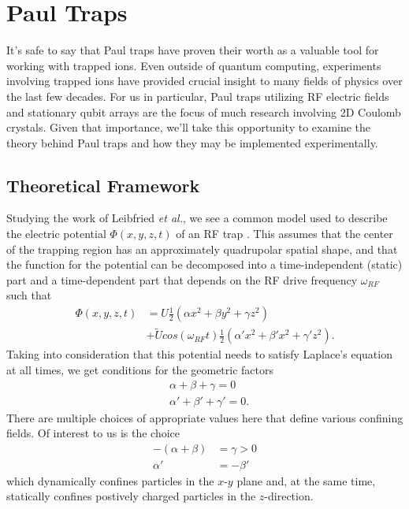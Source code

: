 \section{Paul Traps}
It's safe to say that Paul traps have proven their worth as a valuable tool for working with trapped ions. Even outside of quantum computing, experiments involving trapped ions have provided crucial insight to many fields of physics over the last few decades. For us in particular, Paul traps utilizing RF electric fields and stationary qubit arrays are the focus of much research involving 2D Coulomb crystals. Given that importance, we'll take this opportunity to examine the theory behind Paul traps and how they may be implemented experimentally.

\subsection{Theoretical Framework}
Studying the work of Leibfried \textit{et al.}, we see a common model used to describe the electric potential $\Phi(x, y, z, t)$ of an RF trap \cite{Leibfried}. This assumes that the center of the trapping region has an approximately quadrupolar spatial shape, and that the function for the potential can be decomposed into a time-independent (static) part and a time-dependent part that depends on the RF drive frequency $\omega_{RF}$ such that
\begin{align}
    \Phi(x, y, z, t) &= U \frac{1}{2}(\alpha x^2 + \beta y^2 + \gamma z^2)\\ 
    \nonumber&+ {\widetilde{U}} cos(\omega_{RF}t) \frac{1}{2}(\alpha' x^2 + \beta' x^2 + \gamma' z^2).
\end{align}
Taking into consideration that this potential needs to satisfy Laplace's equation at all times, we get conditions for the geometric factors
\begin{align}
    &\alpha + \beta + \gamma = 0\\
    \nonumber &\alpha' + \beta' + \gamma' = 0.
\end{align}
There are multiple choices of appropriate values here that define various confining fields. Of interest to us is the choice
\begin{align}
    -(\alpha + \beta) &= \gamma > 0\\
    \nonumber \alpha' &= -\beta'
\end{align}
which dynamically confines particles in the $x$-$y$ plane and, at the same time, statically confines postively charged particles in the $z$-direction.

